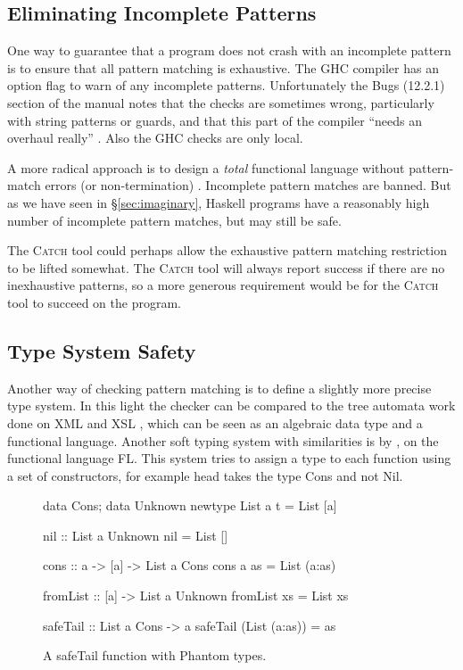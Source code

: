 \documentclass[preprint]{sigplanconf}
\newcommand{\C}[1]{\textsf{#1}}
\newcommand{\catch}{\textsc{Catch}}
\newenvironment{discuss}
    {\noindent\hspace{-1.5mm}\vline\hspace{1mm}\vline\hspace{1mm}\begin{minipage}[h]{\linewidth}}
    {\end{minipage}}
\begin{document}
\subsection{Eliminating Incomplete Patterns}

One way to guarantee that a program does not crash with an incomplete pattern is to ensure that all pattern matching is exhaustive. The GHC compiler \citep{ghc} has an option flag to warn of any incomplete patterns. Unfortunately the Bugs (12.2.1) section of the manual notes that the checks are sometimes wrong, particularly with string patterns or guards, and that this part of the compiler ``needs an overhaul really'' \citep{ghc}. Also the GHC checks are only local.

\begin{discuss}
A more radical approach is to design a \textit{total} functional language without pattern-match errors (or non-termination) \citep{turner:total}. Incomplete pattern matches are banned. But as we have seen in \S\ref{sec:imaginary}, Haskell programs have a reasonably high number of incomplete pattern matches, but may still be safe.

The \catch{} tool could perhaps allow the exhaustive pattern matching restriction to be lifted somewhat. The \catch{} tool will always report success if there are no inexhaustive patterns, so a more generous requirement would be for the \catch{} tool to succeed on the program.
\end{discuss}

\subsection{Type System Safety}

\begin{discuss}
Another way of checking pattern matching is to define a slightly more precise type system. In this light the checker can be compared to the tree automata work done on XML and XSL \citep{static_xslt}, which can be seen as an algebraic data type and a functional language. Another soft typing system with similarities is by \citet{aiken:type_infer}, on the functional language FL. This system tries to assign a type to each function using a set of constructors, for example \C{head} takes the type \C{Cons} and not \C{Nil}.
\end{discuss}

\begin{figure}
\begin{code}
data Cons; data Unknown
newtype List a t = List [a]

nil :: List a Unknown
nil = List []

cons :: a -> [a] -> List a Cons
cons a as = List (a:as)

fromList :: [a] -> List a Unknown
fromList xs = List xs

safeTail :: List a Cons -> a
safeTail (List (a:as)) = as
\end{code}
\caption{A \C{safeTail} function with Phantom types.}
\label{fig:phantom}
\end{figure}
\end{document}
